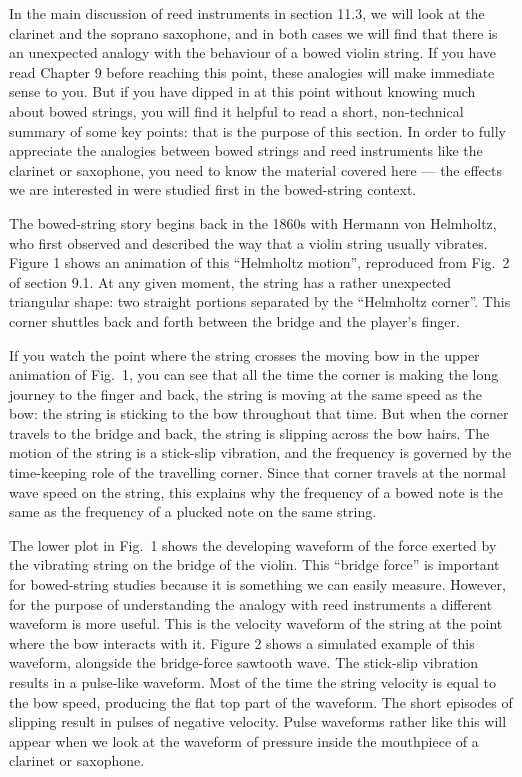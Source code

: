  In the main discussion of reed instruments in section 11.3, we will look at 
  the clarinet and the soprano saxophone, and in both cases we will find that 
  there is an unexpected analogy with the behaviour of a bowed violin string. 
  If you have read Chapter 9 before reaching this point, these analogies will 
  make immediate sense to you. But if you have dipped in at this point without 
  knowing much about bowed strings, you will find it helpful to read a short, 
  non-technical summary of some key points: that is the purpose of this 
  section. In order to fully appreciate the analogies between bowed strings and 
  reed instruments like the clarinet or saxophone, you need to know the 
  material covered here — the effects we are interested in were studied first 
  in the bowed-string context. 

  The bowed-string story begins back in the 1860s with Hermann von Helmholtz, 
  who first observed and described the way that a violin string usually 
  vibrates. Figure 1 shows an animation of this “Helmholtz motion”, reproduced 
  from Fig.\ 2 of section 9.1. At any given moment, the string has a rather 
  unexpected triangular shape: two straight portions separated by the 
  “Helmholtz corner”. This corner shuttles back and forth between the bridge 
  and the player’s finger. 

  If you watch the point where the string crosses the moving bow in the upper 
  animation of Fig.\ 1, you can see that all the time the corner is making the 
  long journey to the finger and back, the string is moving at the same speed 
  as the bow: the string is sticking to the bow throughout that time. But when 
  the corner travels to the bridge and back, the string is slipping across the 
  bow hairs. The motion of the string is a stick-slip vibration, and the 
  frequency is governed by the time-keeping role of the travelling corner. 
  Since that corner travels at the normal wave speed on the string, this 
  explains why the frequency of a bowed note is the same as the frequency of a 
  plucked note on the same string. 

  The lower plot in Fig.\ 1 shows the developing waveform of the force exerted 
  by the vibrating string on the bridge of the violin. This “bridge force” is 
  important for bowed-string studies because it is something we can easily 
  measure. However, for the purpose of understanding the analogy with reed 
  instruments a different waveform is more useful. This is the velocity 
  waveform of the string at the point where the bow interacts with it. Figure 2 
  shows a simulated example of this waveform, alongside the bridge-force 
  sawtooth wave. The stick-slip vibration results in a pulse-like waveform. 
  Most of the time the string velocity is equal to the bow speed, producing the 
  flat top part of the waveform. The short episodes of slipping result in 
  pulses of negative velocity. Pulse waveforms rather like this will appear 
  when we look at the waveform of pressure inside the mouthpiece of a clarinet 
  or saxophone. 

